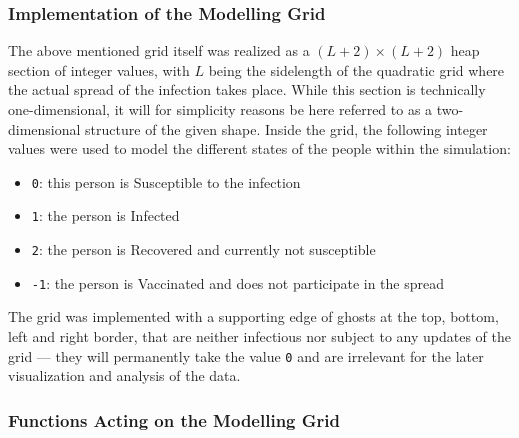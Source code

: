 \subsubsection{Implementation of the Modelling Grid}\label{ssec:impl_modelling_grid}

The above mentioned grid itself was realized as a $\left(L+2\right)\times \left(L+2\right)$ heap section of integer values, with $L$ being the sidelength of the quadratic grid where the actual spread of the
infection takes place. While this section is technically one-dimensional, it will for simplicity reasons be here referred to as a two-dimensional structure of the given shape. 
Inside the grid, the following integer values were used to model the different states of the people within the simulation:
\begin{itemize}
    \item \texttt{0}: this person is Susceptible \susceptible{} to the infection
    \item \texttt{1}: the person is Infected \infected{}
    \item \texttt{2}: the person is Recovered \recovered{} and currently not susceptible
    \item \texttt{-1}: the person is Vaccinated \vaccinated{} and does not participate in the spread
\end{itemize}
The grid was implemented with a supporting edge of ghosts at the top, bottom, left and right border, that are neither infectious nor subject to any updates of the grid --- they will permanently take the value
\texttt{0} and are irrelevant for the later visualization and analysis of the data.


\subsubsection{Functions Acting on the Modelling Grid}\label{ssec:impl_functions_on_grid}

